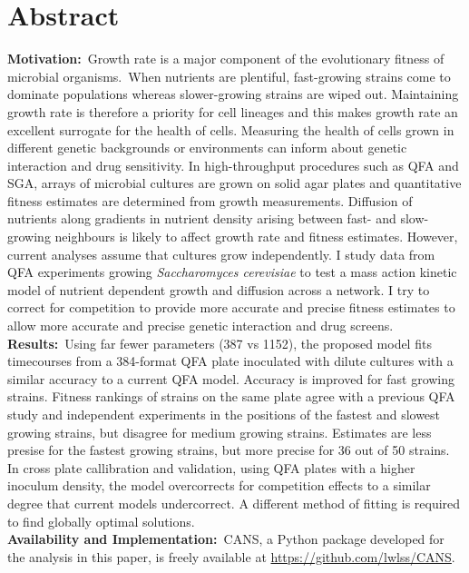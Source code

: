 \section*{Abstract}
\label{sec:abstract}

\textbf{Motivation:}~Growth rate is a major component of the
evolutionary fitness of microbial organisms.~When nutrients are
plentiful, fast-growing strains come to dominate populations whereas
slower-growing strains are wiped out. Maintaining growth rate is
therefore a priority for cell lineages and this makes growth rate an
excellent surrogate for the health of cells. Measuring the health of
cells grown in different genetic backgrounds or environments can
inform about genetic interaction and drug sensitivity. In
high-throughput procedures such as QFA and SGA, arrays of microbial
cultures are grown on solid agar plates and quantitative fitness
estimates are determined from growth measurements. Diffusion of
nutrients along gradients in nutrient density arising between fast-
and slow-growing neighbours is likely to affect growth rate and
fitness estimates. However, current analyses assume that cultures grow
independently. I study data from QFA experiments growing
\textit{Saccharomyces cerevisiae} to test a mass action kinetic model
of nutrient dependent growth and diffusion across a network. I try to
correct for competition to provide more accurate and precise fitness
estimates to allow more accurate and precise genetic interaction and
drug screens.
\\
\textbf{Results:}~Using far fewer parameters (387 vs 1152), the
proposed model fits timecourses from a 384-format QFA plate inoculated
with dilute cultures with a similar accuracy to a current QFA
model. Accuracy is improved for fast growing strains. Fitness rankings
of strains on the same plate agree with a previous QFA study and
independent experiments in the positions of the fastest and slowest
growing strains, but disagree for medium growing strains. Estimates
are less presise for the fastest growing strains, but more precise for
36 out of 50 strains. In cross plate callibration and validation,
using QFA plates with a higher inoculum density, the model
overcorrects for competition effects to a similar degree that current
models undercorrect. A different method of fitting is required to find
globally optimal solutions.
\\
\textbf{Availability and Implementation:}~CANS, a Python package
developed for the analysis in this paper, is freely available at
\href{https://github.com/lwlss/CANS}{https://github.com/lwlss/CANS}.
